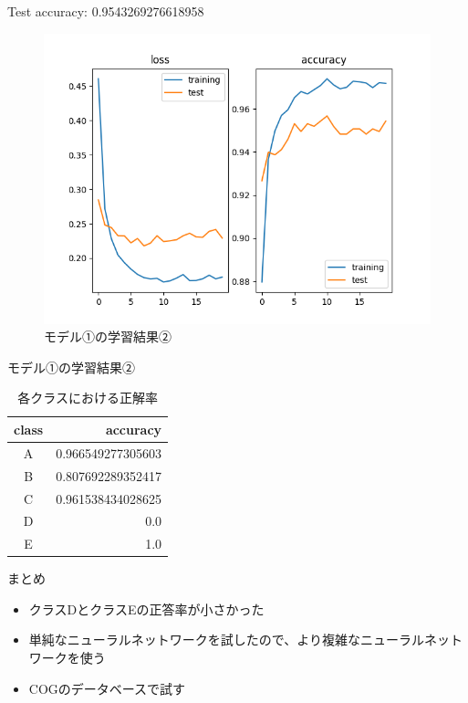 \documentclass[dvipdfmx]{beamer}
\begin{document}
  \begin{frame}
    Test accuracy: 0.9543269276618958
    \begin{figure}
      \centering
      \includegraphics[keepaspectratio, scale=0.6]{images/train_my_ffn_dropout.png}
      \caption{モデル①の学習結果②}
    \end{figure}
  \end{frame}

  \begin{frame}{モデル①の学習結果②}
    \begin{table}[H]
      \centering
      \caption{各クラスにおける正解率}
      \begin{tabular}{cr}
        \hline
        class & accuracy \\
        \hline \hline
        A & 0.966549277305603 \\
        B & 0.807692289352417 \\
        C & 0.961538434028625 \\
        D & 0.0 \\
        E & 1.0 \\
        \hline
      \end{tabular}
    \end{table}
  \end{frame}

  \begin{frame}{まとめ}
    \begin{itemize}
      \item クラスDとクラスEの正答率が小さかった
      \item 単純なニューラルネットワークを試したので、より複雑なニューラルネットワークを使う
      \item COGのデータベースで試す
    \end{itemize}
  \end{frame}
\end{document}
